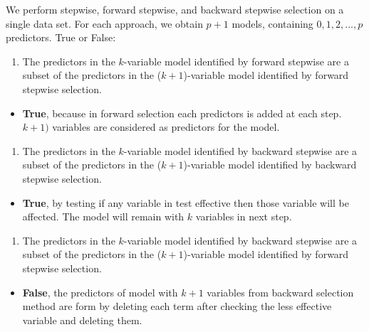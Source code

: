 \documentclass[
]{article}
\providecommand{\tightlist}{%
  \setlength{\itemsep}{0pt}\setlength{\parskip}{0pt}}
\begin{document}
We perform stepwise, forward stepwise, and backward stepwise selection
on a single data set. For each approach, we obtain \(p + 1\) models,
containing \(0, 1, 2, \ldots , p\) predictors. True or False:

\begin{enumerate}
\def\labelenumi{(\alph{enumi})}
\tightlist
\item
  The predictors in the \(k\)-variable model identified by forward
  stepwise are a subset of the predictors in the (\(k+1\))-variable
  model identified by forward stepwise selection.
\end{enumerate}

\begin{itemize}
\tightlist
\item
  \textbf{True}, because in forward selection each predictors is added
  at each step. \(k+1)\) variables are considered as predictors for the
  model.
\end{itemize}

\begin{enumerate}
\def\labelenumi{(\alph{enumi})}
\setcounter{enumi}{1}
\tightlist
\item
  The predictors in the \(k\)-variable model identified by backward
  stepwise are a subset of the predictors in the (\(k + 1\))-variable
  model identified by backward stepwise selection.
\end{enumerate}

\begin{itemize}
\tightlist
\item
  \textbf{True}, by testing if any variable in test effective then those
  variable will be affected. The model will remain with \(k\) variables
  in next step.
\end{itemize}

\begin{enumerate}
\def\labelenumi{(\alph{enumi})}
\setcounter{enumi}{2}
\tightlist
\item
  The predictors in the \(k\)-variable model identified by backward
  stepwise are a subset of the predictors in the (\(k + 1\))-variable
  model identified by forward stepwise selection.
\end{enumerate}

\begin{itemize}
\tightlist
\item
  \textbf{False}, the predictors of model with \(k + 1\) variables from
  backward selection method are form by deleting each term after
  checking the less effective variable and deleting them.
\end{itemize}
\end{document}
